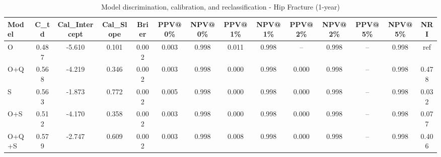 \begin{table}[htbp]
\centering
\small
\caption{Model discrimination, calibration, and reclassification - Hip Fracture (1-year)}
\label{tab:perf_pd_1y}
\begin{tabular}{lccccccccccccc}
\toprule
Model & C\_td & Cal\_Intercept & Cal\_Slope & Brier & PPV@0\% & NPV@0\% & PPV@1\% & NPV@1\% & PPV@2\% & NPV@2\% & PPV@5\% & NPV@5\% & NRI \\
\midrule
O & 0.487 & -5.610 & 0.101 & 0.002 & 0.003 & 0.998 & 0.011 & 0.998 & -- & 0.998 & -- & 0.998 & ref \\
O+Q & 0.568 & -4.219 & 0.346 & 0.002 & 0.003 & 0.998 & 0.000 & 0.998 & 0.000 & 0.998 & -- & 0.998 & 0.478 \\
S & 0.563 & -1.873 & 0.772 & 0.002 & 0.005 & 0.998 & 0.000 & 0.998 & 0.000 & 0.998 & -- & 0.998 & 0.032 \\
O+S & 0.512 & -4.170 & 0.358 & 0.002 & 0.003 & 0.998 & 0.000 & 0.998 & 0.000 & 0.998 & -- & 0.998 & 0.077 \\
O+Q+S & 0.579 & -2.747 & 0.609 & 0.002 & 0.003 & 0.998 & 0.008 & 0.998 & 0.000 & 0.998 & -- & 0.998 & 0.406 \\
\bottomrule
\end{tabular}
\end{table}
